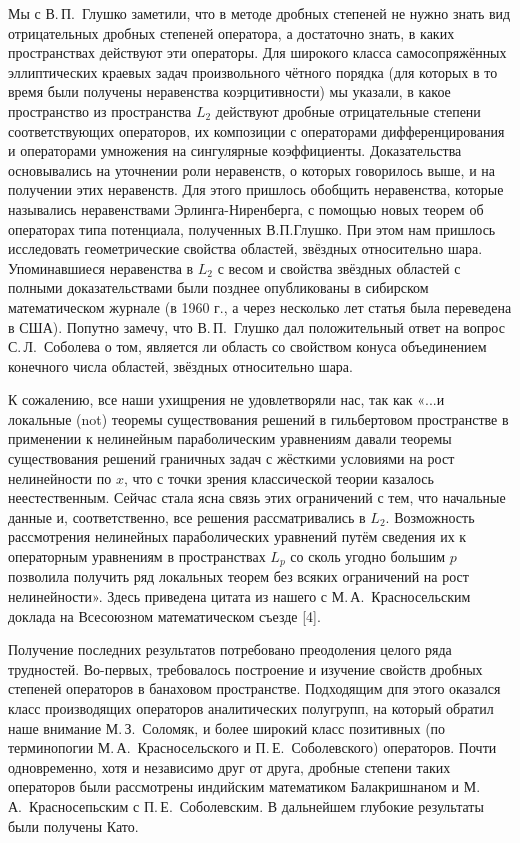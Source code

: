 Мы с В.\,П.~Глушко заметили, что в методе дробных степеней не нужно знать вид отрицательных дробных степеней оператора,
а достаточно знать, в каких пространствах действуют эти операторы.
Для широкого класса самосопряжённых эллиптических краевых задач произвольного чётного порядка
(для которых в то время были получены неравенства коэрцитивности) мы указали, в какое пространство из пространства $L_2$
действуют дробные отрицательные степени соответствующих операторов,
их композиции с операторами дифференцирования и операторами умножения на сингулярные коэффициенты.
Доказательства основывались на уточнении роли неравенств, о которых говорилось выше, и на получении этих неравенств.
Для этого пришлось обобщить неравенства, которые назывались неравенствами Эрлинга-Ниренберга,
с помощью новых теорем об операторах типа потенциала, полученных В.П.Глушко.
При этом нам пришлось исследовать геометрические свойства областей, звёздных относительно шара.
Упоминавшиеся неравенства в $L_2$
с весом и свойства звёздных областей с полными доказательствами были позднее опубликованы
в сибирском математическом журнале (в 1960 г., а через несколько лет статья была переведена в США).
Попутно замечу, что В.\,П.~Глушко дал положительный ответ на вопрос С.\,Л.~Соболева о том, является ли область со свойством конуса объединением конечного числа областей, звёздных относительно шара.

К сожалению, все наши ухищрения не удовлетворяли нас,
так как «...и локальные (not) теоремы существования решений в гильбертовом пространстве
в применении к нелинейным параболическим уравнениям давали теоремы существования решений граничных задач
с жёсткими условиями на рост нелинейности по $x$,
что с точки зрения классической теории казалось неестественным.
Сейчас стала ясна связь этих ограничений с тем, что начальные данные и, соответственно,
все решения рассматривались в $L_2$.
Возможность рассмотрения нелинейных параболических уравнений путём сведения их к операторным уравнениям в пространствах $L_p$
со сколь угодно большим $p$ позволила получить ряд локальных теорем без всяких ограничений на рост нелинейности».
Здесь приведена цитата из нашего с М.\,А.~Красносельским доклада на Всесоюзном математическом съезде [4].

Получение последних результатов потребовано преодоления целого ряда трудностей.
Во-первых, требовалось построение и изучение свойств дробных степеней операторов в банаховом пространстве.
Подходящим дпя этого оказался класс производящих операторов аналитических полугрупп,
на который обратил наше внимание М.\,З.~Соломяк, и более широкий класс позитивных
(по терминопогии М.\,А.~Красносельского и П.\,Е.~Соболевского) операторов. Почти одновременно, хотя и независимо друг от друга, дробные степени таких операторов были рассмотрены индийским математиком Балакришнаном и М.\,А.~Красносепьским с П.\,Е.~Соболевским. В дальнейшем глубокие результаты были получены Като.

